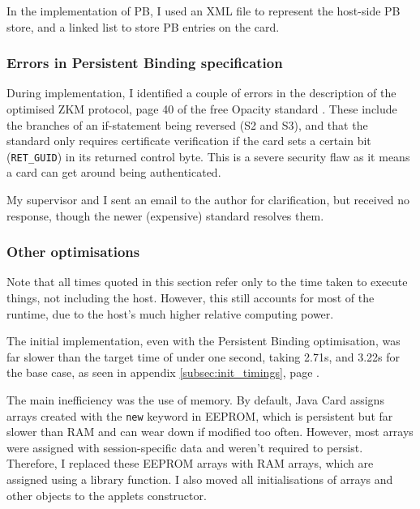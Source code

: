 \documentclass[12pt,a4paper]{article}
\begin{document}
In the implementation of PB, I used an XML file to represent the host-side PB store, and a linked list to store PB entries on the card.

\subsubsection{Errors in Persistent Binding specification}
\label{subsec:pb_errors}
During implementation, I identified a couple of errors in the description of the optimised ZKM protocol, page 40 of the free Opacity standard \cite{opacityfree}. These include the branches of an if-statement being reversed (S2 and S3), and that the standard only requires certificate verification if the card sets a certain bit (\verb|RET_GUID|) in its returned control byte. This is a severe security flaw as it means a card can get around being authenticated.

My supervisor and I sent an email to the author for clarification, but received no response, though the newer (expensive) standard resolves them.





\subsubsection{Other optimisations}
\label{subsec:other_opts}
Note that all times quoted in this section refer only to the time taken to execute things, not including the host. However, this still accounts for most of the runtime, due to the host's much higher relative computing power.

The initial implementation, even with the Persistent Binding optimisation, was far slower than the target time of under one second, taking 2.71s, and 3.22s for the base case, as seen in appendix \ref{subsec:init_timings}, page \pageref{subsec:init_timings}.

The main inefficiency was the use of memory. By default, Java Card assigns arrays created with the \verb|new| keyword in EEPROM, which is persistent but far slower than RAM and can wear down if modified too often. However, most arrays were assigned with session-specific data and weren't required to persist. Therefore, I replaced these EEPROM arrays with RAM arrays, which are assigned using a library function. I also moved  all initialisations of arrays and other objects to the applets constructor.
\end{document}
